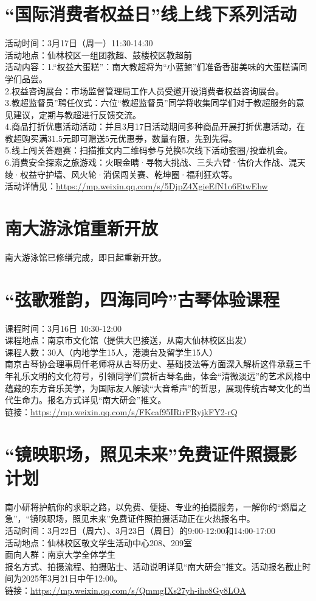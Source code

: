 \documentclass[letterpaper, 12pt]{article}
\begin{document}
\begin{multicols}{2}
\section{“国际消费者权益日”线上线下系列活动}
活动时间：3月17日（周一）11:30-14:30\\
活动地点：仙林校区一组团教超、鼓楼校区教超前\\
活动内容：1.“权益大蛋糕”：南大教超将为“小蓝鲸”们准备香甜美味的大蛋糕请同学们品尝。\\
2.权益咨询展台：市场监督管理局工作人员受邀开设消费者权益咨询展台。\\
3.教超监督员”聘任仪式：六位“教超监督员”同学将收集同学们对于教超服务的意见建议，定期与教超进行反馈交流。\\
4.商品打折优惠活动活动：并且3月17日活动期间多种商品开展打折优惠活动，在教超购买满31.5元即可赠送5元优惠券，数量有限，先到先得。\\
5.线上闯关答题赛：扫描推文内二维码参与兑换5次线下活动套圈/投壶机会。\\
6.消费安全探索之旅游戏：火眼金睛·寻物大挑战、三头六臂·估价大作战、混天绫·权益守护墙、风火轮·消保闯关赛、乾坤圈·福利狂欢等。\\
活动详情见：\url{https://mp.weixin.qq.com/s/5DjpZ4XgieEfN1o6EtwEhw}


\section{南大游泳馆重新开放}
南大游泳馆已修缮完成，即日起重新开放。
\section{“弦歌雅韵，四海同吟”古琴体验课程}
课程时间：3月16日 10:30-12:00\\
课程地点：南京市文化馆（提供大巴接送，从南大仙林校区出发）\\
课程人数：30人（内地学生15人，港澳台及留学生15人）\\
南京古琴协会理事周仟老师将从古琴历史、基础技法等方面深入解析这件承载三千年礼乐文明的文化符号，引领同学们赏析古琴名曲，体会“清微淡远”的艺术风格中蕴藏的东方音乐美学，为国际友人解读“大音希声”的哲思，展现传统古琴文化的当代生命力。报名方式详见“南大研会”推文。\\
链接：\url{https://mp.weixin.qq.com/s/FKcaf95IRirFRyjkFY2-rQ}
\section{“镜映职场，照见未来”免费证件照摄影计划}
南小研将护航你的求职之路，以免费、便捷、专业的拍摄服务，一解你的“燃眉之急”，“镜映职场，照见未来”免费证件照拍摄活动正在火热报名中。\\
活动时间：3月22日（周六）、3月23日（周日）的9:00-12:00和14:00-17:00\\
活动地点：仙林校区敬文学生活动中心208、209室\\
面向人群：南京大学全体学生\\
报名方式、拍摄流程、拍摄贴士、活动说明详见“南大研会”推文。活动报名截止时间为2025年3月21日中午12:00。\\
链接：\url{https://mp.weixin.qq.com/s/QmmgIXs27yh-ihc8Gy8LOA}


\end{multicols}
\end{document}
